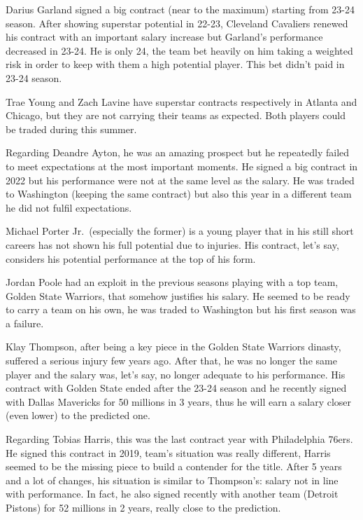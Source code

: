 \documentclass[
]{article}
\begin{document}
Darius Garland signed a big contract (near to the maximum) starting from
23-24 season. After showing superstar potential in 22-23, Cleveland
Cavaliers renewed his contract with an important salary increase but
Garland's performance decreased in 23-24. He is only 24, the team bet
heavily on him taking a weighted risk in order to keep with them a high
potential player. This bet didn't paid in 23-24 season.

Trae Young and Zach Lavine have superstar contracts respectively in
Atlanta and Chicago, but they are not carrying their teams as expected.
Both players could be traded during this summer.

Regarding Deandre Ayton, he was an amazing prospect but he repeatedly
failed to meet expectations at the most important moments. He signed a
big contract in 2022 but his performance were not at the same level as
the salary. He was traded to Washington (keeping the same contract) but
also this year in a different team he did not fulfil expectations.

Michael Porter Jr.~(especially the former) is a young player that in his
still short careers has not shown his full potential due to injuries.
His contract, let's say, considers his potential performance at the top
of his form.

Jordan Poole had an exploit in the previous seasons playing with a top
team, Golden State Warriors, that somehow justifies his salary. He
seemed to be ready to carry a team on his own, he was traded to
Washington but his first season was a failure.

Klay Thompson, after being a key piece in the Golden State Warriors
dinasty, suffered a serious injury few years ago. After that, he was no
longer the same player and the salary was, let's say, no longer adequate
to his performance. His contract with Golden State ended after the 23-24
season and he recently signed with Dallas Mavericks for 50 millions in 3
years, thus he will earn a salary closer (even lower) to the predicted
one.

Regarding Tobias Harris, this was the last contract year with
Philadelphia 76ers. He signed this contract in 2019, team's situation
was really different, Harris seemed to be the missing piece to build a
contender for the title. After 5 years and a lot of changes, his
situation is similar to Thompson's: salary not in line with performance.
In fact, he also signed recently with another team (Detroit Pistons) for
52 millions in 2 years, really close to the prediction.
\end{document}
